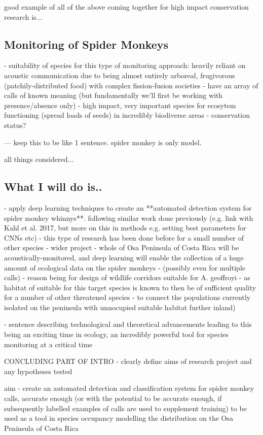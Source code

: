 \documentclass[11pt]{article}
\begin{document}
good example of all of the above coming together for high impact conservation research is...

\subsection{Monitoring of Spider Monkeys}
- suitability of species for this type of monitoring approach: heavily reliant on acoustic communication due to being almost entirely arboreal, frugivorous (patchily-distributed food) with complex fission-fusion societies 
- have an array of calls of known meaning (but fundamentally we'll first be working with presence/absence only)
- high impact, very important species for ecosytem functioning (spread loads of seeds) in incredibly biodiverse areas
- conservation status?

--- keep this to be like 1 sentence. spider monkey is only model. 

all things considered...
\subsection{What I will do is..}

- apply deep learning techniques to create an **automated detection system for spider monkey whinnys**. following similar work done previously (e.g. link with Kahl et al. 2017, but more on this in methods e.g. setting best parameters for CNNs etc)
- this type of research has been done before for a small number of other species 
- wider project - whole of Osa Peninsula of Costa Rica will be acoustically-monitored, and deep learning will enable the collection of a huge amount of ecological data on the spider monkeys
- (possibly even for multiple calls)
- reason being for design of wildlife corridors suitable for A. geoffroyi - as habitat of suitable for this target species is known to then be of sufficient quality for a number of other threatened species - to connect the populations currently isolated on the peninsula with unnocupied suitable habitat further inland)


- sentence describing technological and theoretical advancements leading to this being an exciting time in ecology, an incredibly powerful tool for species monitoring at a critical time 




CONCLUDING PART OF INTRO - clearly define aims of research project and any hypotheses tested

aim - create an automated detection and classification system for spider monkey calls, accurate enough (or with the potential to be accurate enough, if subsequently labelled examples of calls are used to supplement training) to be used as a tool in species occupancy modelling the distribution on the Osa Peninsula of Costa Rica
\end{document}
